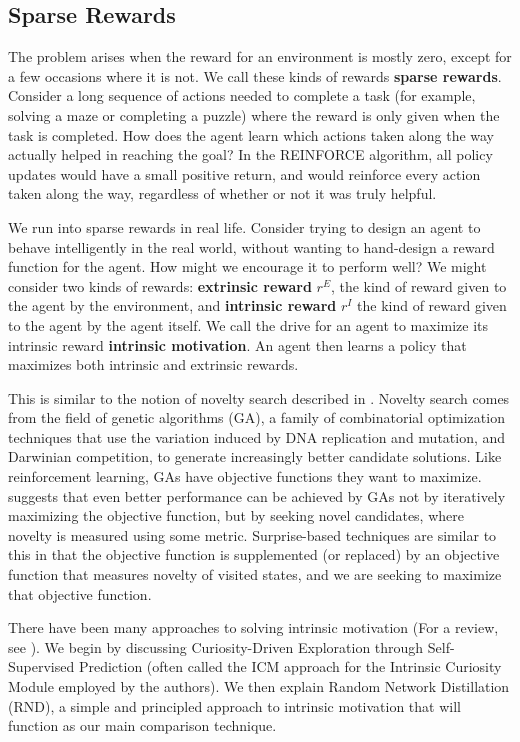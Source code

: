 \documentclass[journal, onecolumn, 12pt, draftclsnofoot]{IEEEtran}
\newcommand{\kword}[1]{\textbf{#1}}
\begin{document}
	\subsection{Sparse Rewards}
	\par The problem arises when the reward for an environment is mostly zero, except for a few occasions where it is not. We call these kinds of rewards \kword{sparse rewards}. Consider a long sequence of actions needed to complete a task (for example, solving a maze or completing a puzzle) where the reward is only given when the task is completed. How does the agent learn which actions taken along the way actually helped in reaching the goal? In the REINFORCE algorithm, all policy updates would have a small positive return, and would reinforce every action taken along the way, regardless of whether or not it was truly helpful.
	\par We run into sparse rewards in real life. Consider trying to design an agent to behave intelligently in the real world, without wanting to hand-design a reward function for the agent. How might we encourage it to perform well? We might consider two kinds of rewards: \kword{extrinsic reward} $r^E$, the kind of reward given to the agent by the environment, and \kword{intrinsic reward} $r^I$ the kind of reward given to the agent by the agent itself. We call the drive for an agent to maximize its intrinsic reward \kword{intrinsic motivation}. An agent then learns a policy that maximizes both intrinsic and extrinsic rewards.
		\par This is similar to the notion of novelty search described in \cite{novelty}. Novelty search comes from the field of genetic algorithms (GA), a family of combinatorial optimization techniques that use the variation induced by DNA replication and mutation, and Darwinian competition, to generate increasingly better candidate solutions. Like reinforcement learning, GAs have objective functions they want to maximize. \cite{novelty} suggests that even better performance can be achieved by GAs not by iteratively maximizing the objective function, but by seeking novel candidates, where novelty is measured using some metric. Surprise-based techniques are similar to this in that the objective function is supplemented (or replaced) by an objective function that measures novelty of visited states, and we are seeking to maximize that objective function.
	\par There have been many approaches to solving intrinsic motivation (For a review, see \cite{large-scale-study}). We begin by discussing Curiosity-Driven Exploration through Self-Supervised Prediction (often called the ICM approach for the Intrinsic Curiosity Module employed by the authors). We then explain Random Network Distillation (RND), a simple and principled approach to intrinsic motivation that will function as our main comparison technique.
\end{document}
